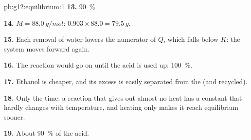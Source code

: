 \begin{solution}{pb:g12:equilibrium:1}
\textbf{13.} \qty{90}{\percent}.

\textbf{14.} $M = \qty{88.0}{g/mol}$: $0.903 \times 88.0 = \qty{79.5}{g}$.

\textbf{15.} Each removal of water lowers the numerator of $Q$, which
falls below $K$: the system moves forward again.

\textbf{16.} The reaction would go on until the acid is used up:
\qty{100}{\percent}.

\textbf{17.} Ethanol is cheaper, and its excess is easily separated from
the  (and recycled).

\textbf{18.} Only the time: a reaction that gives out almost no heat has
a constant that hardly changes with temperature, and heating only makes
it reach equilibrium sooner.

\textbf{19.} About \qty{90}{\percent} of the acid.
\end{solution}

